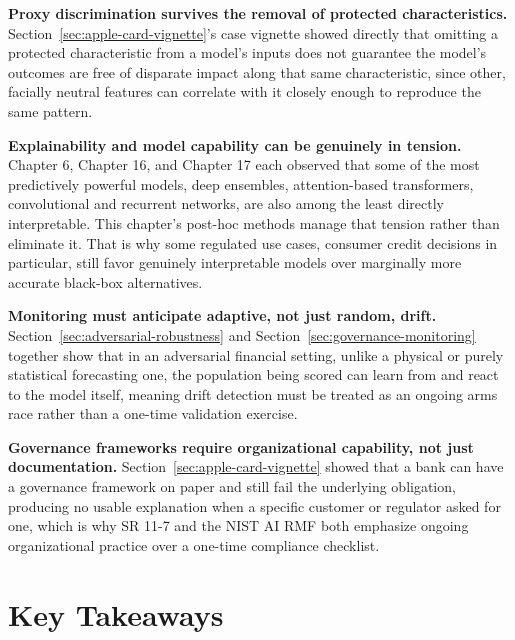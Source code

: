 \documentclass[../ai_in_finance]{subfiles}
\begin{document}
\textbf{Proxy discrimination survives the removal of protected characteristics.} Section~\ref{sec:apple-card-vignette}'s case vignette showed directly that omitting a protected characteristic from a model's inputs does not guarantee the model's outcomes are free of disparate impact along that same characteristic, since other, facially neutral features can correlate with it closely enough to reproduce the same pattern.

\textbf{Explainability and model capability can be genuinely in tension.} Chapter 6, Chapter 16, and Chapter 17 each observed that some of the most predictively powerful models, deep ensembles, attention-based transformers, convolutional and recurrent networks, are also among the least directly interpretable. This chapter's post-hoc methods manage that tension rather than eliminate it. That is why some regulated use cases, consumer credit decisions in particular, still favor genuinely interpretable models over marginally more accurate black-box alternatives.

\textbf{Monitoring must anticipate adaptive, not just random, drift.} Section~\ref{sec:adversarial-robustness} and Section~\ref{sec:governance-monitoring} together show that in an adversarial financial setting, unlike a physical or purely statistical forecasting one, the population being scored can learn from and react to the model itself, meaning drift detection must be treated as an ongoing arms race rather than a one-time validation exercise.

\textbf{Governance frameworks require organizational capability, not just documentation.} Section~\ref{sec:apple-card-vignette} showed that a bank can have a governance framework on paper and still fail the underlying obligation, producing no usable explanation when a specific customer or regulator asked for one, which is why SR 11-7 and the NIST AI RMF both emphasize ongoing organizational practice over a one-time compliance checklist.

\section{Key Takeaways}
\end{document}
